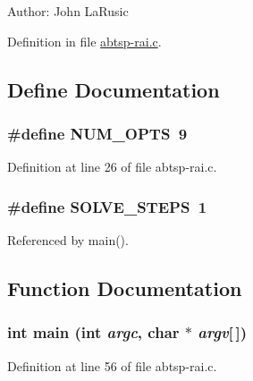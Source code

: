 \begin{Desc}
\item[Author:]John LaRusic \end{Desc}


Definition in file \hyperlink{abtsp-rai_8c-source}{abtsp-rai.c}.

\subsection{Define Documentation}
\hypertarget{abtsp-rai_8c_9b58b2c4af931c8486a986c9deca40f5}{
\subsubsection[{NUM\_\-OPTS}]{\setlength{\rightskip}{0pt plus 5cm}\#define NUM\_\-OPTS~9}}
\label{abtsp-rai_8c_9b58b2c4af931c8486a986c9deca40f5}




Definition at line 26 of file abtsp-rai.c.\hypertarget{abtsp-rai_8c_ceebcce8f411269df7b99e78247d7497}{
\subsubsection[{SOLVE\_\-STEPS}]{\setlength{\rightskip}{0pt plus 5cm}\#define SOLVE\_\-STEPS~1}}
\label{abtsp-rai_8c_ceebcce8f411269df7b99e78247d7497}




Referenced by main().

\subsection{Function Documentation}
\hypertarget{abtsp-rai_8c_0ddf1224851353fc92bfbff6f499fa97}{
\subsubsection[{main}]{\setlength{\rightskip}{0pt plus 5cm}int main (int {\em argc}, \/  char $\ast$ {\em argv}\mbox{[}$\,$\mbox{]})}}
\label{abtsp-rai_8c_0ddf1224851353fc92bfbff6f499fa97}




Definition at line 56 of file abtsp-rai.c.


